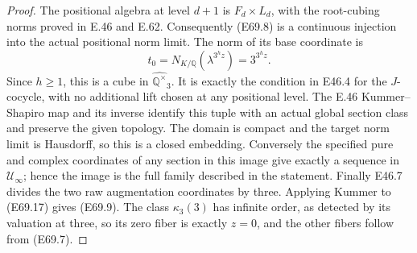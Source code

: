 \begin{proof}
The positional algebra at level $d+1$ is $F_d\times L_d$, with
the root-cubing norms proved in E.46 and E.62.
Consequently (E69.8) is a continuous injection into the actual
positional norm limit. The norm of its base coordinate is
\[
           t_0=N_{K/\mathbb Q}(\lambda^{3^h z})
                   =3^{3^h z}.
 \tag{E69.17}
\]
Since $h\ge1$, this is a cube in
$\widehat{\mathbb Q^\times}_3$. It is exactly the condition
in E46.4 for the $J$-cocycle, with no additional lift chosen at
any positional level.
The E.46 Kummer--Shapiro map and its inverse identify this tuple
with an actual global section class and preserve the given
topology. The domain is compact and the target norm limit is
Hausdorff, so this is a closed embedding.
Conversely the specified pure and complex coordinates of any
section in this image give exactly a sequence in
$\mathcal U_\infty$; hence the image is the full family described
in the statement.
Finally E46.7 divides the two raw augmentation coordinates by
three. Applying Kummer to (E69.17) gives (E69.9).
The class $\kappa_3(3)$ has infinite order, as detected by its
valuation at three, so its zero fiber is exactly $z=0$, and the
other fibers follow from (E69.7).
\end{proof}
